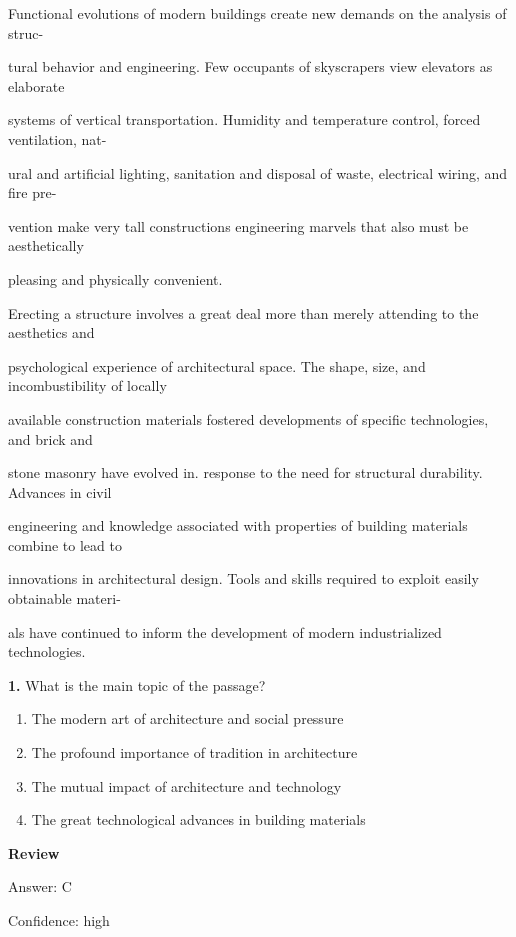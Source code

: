 \documentclass[12pt]{article}
\begin{document}
Functional evolutions of modern buildings create new demands on the analysis of struc-\par
tural behavior and engineering. Few occupants of skyscrapers view elevators as elaborate\par
systems of vertical transportation. Humidity and temperature control, forced ventilation, nat-\par
ural and artificial lighting, sanitation and disposal of waste, electrical wiring, and fire pre-\par
vention make very tall constructions engineering marvels that also must be aesthetically\par
pleasing and physically convenient.\par
Erecting a structure involves a great deal more than merely attending to the aesthetics and\par
psychological experience of architectural space. The shape, size, and incombustibility of locally\par
available construction materials fostered developments of specific technologies, and brick and\par
stone masonry have evolved in. response to the need for structural durability. Advances in civil\par
engineering and knowledge associated with properties of building materials combine to lead to\par
innovations in architectural design. Tools and skills required to exploit easily obtainable materi-\par
als have continued to inform the development of modern industrialized technologies.\par
\endgroup
\medskip
\noindent\textbf{1.} What is the main topic of the passage?
\begin{enumerate}[label=(\Alph*),leftmargin=*,itemsep=0.2em]
\item The modern art of architecture and social pressure
\item The profound importance of tradition in architecture
\item The mutual impact of architecture and technology
\item The great technological advances in building materials
\end{enumerate}
\par
\begingroup
\setlength{\parskip}{0pt}
\setlength{\parindent}{0pt}
\textbf{Review}\par
Answer: C\par
Confidence: high\par
\end{document}
